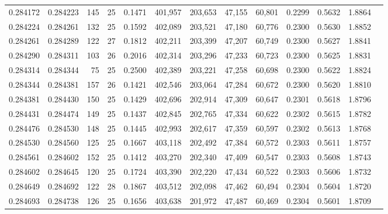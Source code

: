 \begin{tabular}{rrrrrrrrrrrrr}
0.284172 & 0.284223 &   145 &  25 &                                     0.1471 & 401,957 & 203,653 &  47,155 &  60,801 & 0.2299 & 0.5632 & 1.8864 \\
0.284224 & 0.284261 &   132 &  25 &                                     0.1592 & 402,089 & 203,521 &  47,180 &  60,776 & 0.2300 & 0.5630 & 1.8852 \\
0.284261 & 0.284289 &   122 &  27 &                                     0.1812 & 402,211 & 203,399 &  47,207 &  60,749 & 0.2300 & 0.5627 & 1.8841 \\
0.284290 & 0.284311 &   103 &  26 &                                     0.2016 & 402,314 & 203,296 &  47,233 &  60,723 & 0.2300 & 0.5625 & 1.8831 \\
0.284314 & 0.284344 &    75 &  25 &                                     0.2500 & 402,389 & 203,221 &  47,258 &  60,698 & 0.2300 & 0.5622 & 1.8824 \\
0.284344 & 0.284381 &   157 &  26 &                                     0.1421 & 402,546 & 203,064 &  47,284 &  60,672 & 0.2300 & 0.5620 & 1.8810 \\
0.284381 & 0.284430 &   150 &  25 &                                     0.1429 & 402,696 & 202,914 &  47,309 &  60,647 & 0.2301 & 0.5618 & 1.8796 \\
0.284431 & 0.284474 &   149 &  25 &                                     0.1437 & 402,845 & 202,765 &  47,334 &  60,622 & 0.2302 & 0.5615 & 1.8782 \\
0.284476 & 0.284530 &   148 &  25 &                                     0.1445 & 402,993 & 202,617 &  47,359 &  60,597 & 0.2302 & 0.5613 & 1.8768 \\
0.284530 & 0.284560 &   125 &  25 &                                     0.1667 & 403,118 & 202,492 &  47,384 &  60,572 & 0.2303 & 0.5611 & 1.8757 \\
0.284561 & 0.284602 &   152 &  25 &                                     0.1412 & 403,270 & 202,340 &  47,409 &  60,547 & 0.2303 & 0.5608 & 1.8743 \\
0.284602 & 0.284645 &   120 &  25 &                                     0.1724 & 403,390 & 202,220 &  47,434 &  60,522 & 0.2303 & 0.5606 & 1.8732 \\
0.284649 & 0.284692 &   122 &  28 &                                     0.1867 & 403,512 & 202,098 &  47,462 &  60,494 & 0.2304 & 0.5604 & 1.8720 \\
0.284693 & 0.284738 &   126 &  25 &                                     0.1656 & 403,638 & 201,972 &  47,487 &  60,469 & 0.2304 & 0.5601 & 1.8709 \\

\end{tabular}
